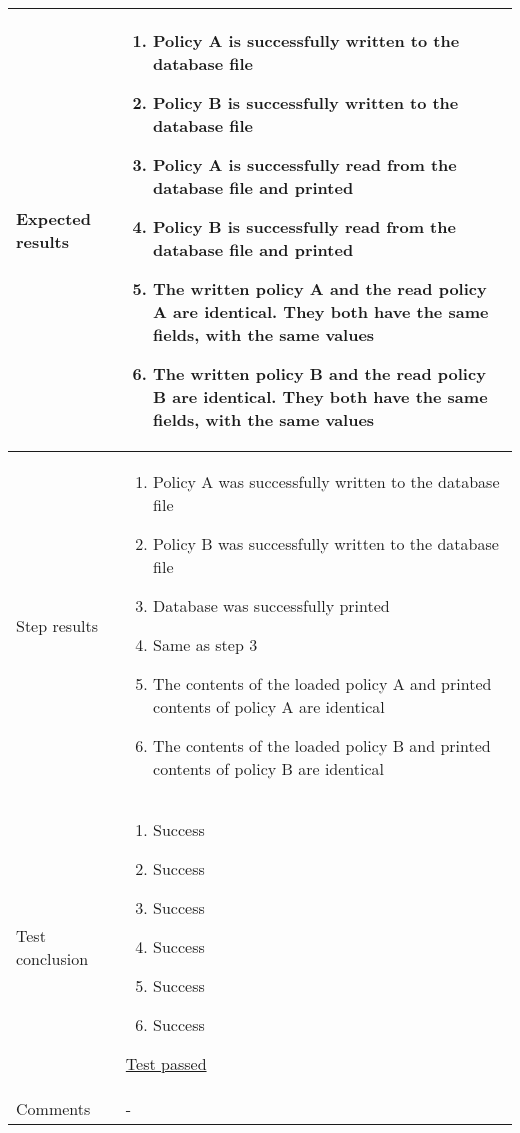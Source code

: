 \begin{center}
\begin{longtable}{ | p{4cm} | p{10cm} | }
			Expected results &	\begin{enumerate}
							\item Policy A is successfully written to the database file
							\item Policy B is successfully written to the database file
							\item Policy A is successfully read from the database file and printed
							\item Policy B is successfully read from the database file and printed
							\item The written policy A and the read policy A are identical. They both have the same fields, with the same values
							\item The written policy B and the read policy B are identical. They both have the same fields, with the same values
						\end{enumerate}
							 \\  [3pt] \hline

			Step results & 	\begin{enumerate}
							\item Policy A was successfully written to the database file
							\item Policy B was successfully written to the database file
							\item Database was successfully printed
							\item Same as step 3
							\item The contents of the loaded policy A and printed contents of policy A are identical
							\item The contents of the loaded policy B and printed contents of policy B are identical
						\end{enumerate}
							 \\  [3pt] \hline

			Test conclusion & 	\begin{enumerate}
							\item Success
							\item Success
							\item Success
							\item Success
							\item Success
							\item Success
						\end{enumerate}
						\underline{Test passed} \\  [3pt] \hline
			Comments &	- \\ [3pt] \hline
		\end{longtable}
	\end{center}

